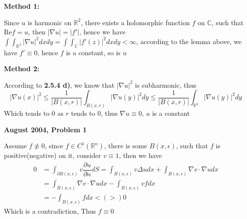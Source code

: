 \documentclass[12pt]{article}
\begin{document}
\textbf{Method 1:} \par
Since $u$ is harmonic on $\mathbb{R}^{2}$, there exists a holomorphic function $f$ on $\mathbb{C}$, such that $\mathrm{Re}f=u$, then $|\nabla u|=|f'|$, hence we have $\displaystyle{
\int\int_{\mathbb{R}^{2}}|\nabla u|^{2}dxdy=\int\int_{\mathbb{C}}|f'(z)|^{2}dxdy < \infty
}$, according to the lemma above, we have $f'\equiv 0$, hence $f$ is a constant, so is $u$ \par
\textbf{Method 2:} \par
According to \textbf{2.5.4 d)}, we know that $|\nabla u|^{2}$ is subharmonic, thus 
$$|\nabla u(x)|^{2} \leq \dfrac{1}{|B(x,r)|}\int_{B(x,r)}|\nabla u(y)|^{2}dy \leq\dfrac{1}{|B(x,r)|}\int_{\mathbb{R}^{2}}|\nabla u(y)|^{2}dy$$Which tends to $0$ as $r$ tends  to $0$, thus $\nabla u \equiv 0$, $u$ is a constant \par
\textbf{August 2004, Problem 1} \par
Assume $f\not\equiv  0$, since $f\in C^{1}(\mathbb{R}^{n})$, there is some $B(x,\epsilon)$, such that $f$ is positive(negative) on it, consider $v\equiv 1$, then we have$$
\begin{aligned}
0 &=\int_{\partial B(x,\epsilon)}v\dfrac{\partial u}{\partial n} dS = \int_{B(x,\epsilon)}v\Delta udx + \int_{B(x,\epsilon)}\nabla v\cdot\nabla udx \\
&= \int_{B(x,\epsilon)}\nabla v\cdot\nabla udx - \int_{B(x,\epsilon)}vfdx \\
&= -\int_{B(x,\epsilon)}fdx <(>) 0
\end{aligned}
$$ Which is a contradiction, Thus $f\equiv 0$
\end{document}

